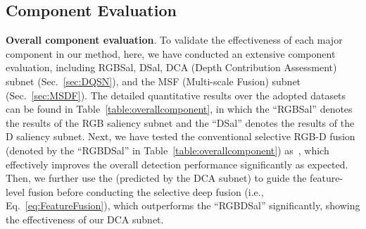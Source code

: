 \documentclass[journal]{IEEEtran}
\begin{document}
\begin{table*}
\begin{center}
\caption{Ablation study on the MSF subnet.  denotes larger is better, and  denotes smaller is better.}
\vspace{-0.2cm}
\end{center}
\end{table*}

\subsection{Component Evaluation}
\textbf{Overall component evaluation}.
To validate the effectiveness of each major component in our method, here, we have conducted an extensive component evaluation, including RGBSal, DSal, DCA (Depth Contribution Assessment) subnet (Sec.~\ref{sec:DQSN}), and the MSF (Multi-scale Fusion) subnet (Sec.~\ref{sec:MSDF}).
The detailed quantitative results over the adopted datasets can be found in Table~\ref{table:overallcomponent}, in which the ``RGBSal'' denotes the results of the RGB saliency subnet and the ``DSal'' denotes the results of the D saliency subnet.
Next, we have tested the conventional selective RGB-D fusion (denoted by the ``RGBDSal'' in Table~\ref{table:overallcomponent}) as~\cite{Zhu2018PDNet}, which effectively improves the overall detection performance significantly as expected.
Then, we further use the  (predicted by the DCA subnet) to guide the feature-level fusion before conducting the selective deep fusion (i.e., Eq.~\ref{eq:FeatureFusion}), which outperforms the ``RGBDSal'' significantly, showing the effectiveness of our DCA subnet.
\end{document}
